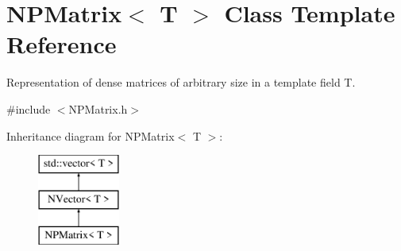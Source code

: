 \hypertarget{class_n_p_matrix}{}\section{N\+P\+Matrix$<$ T $>$ Class Template Reference}
\label{class_n_p_matrix}


Representation of dense matrices of arbitrary size in a template field {\ttfamily T}.  




{\ttfamily \#include $<$N\+P\+Matrix.\+h$>$}

Inheritance diagram for N\+P\+Matrix$<$ T $>$\+:\begin{figure}[H]
\begin{center}
\leavevmode
\includegraphics[height=3.000000cm]{class_n_p_matrix}
\end{center}
\end{figure}
